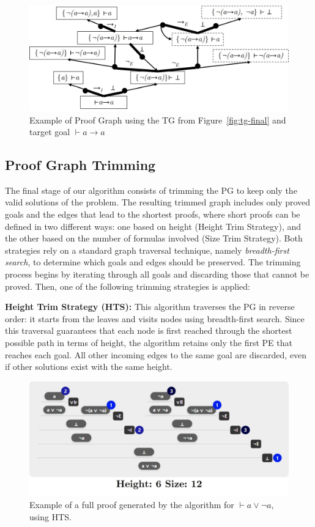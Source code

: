 \begin{figure}[h]
    \centering
    \includegraphics[width=0.8\linewidth]{resources/sg-gen.jpg}
    \caption{Example of Proof Graph using the TG from Figure~\ref{fig:tg-final} and target goal \(\vdash a \to a\)}
    \label{fig:st-ex}
\end{figure}

\subsection{Proof Graph Trimming}

The final stage of our algorithm consists of trimming the PG to keep only the valid solutions of the problem. The resulting trimmed graph includes only proved goals and the edges that lead to the shortest proofs, where short proofs can be defined in two different ways: one based on height (Height Trim Strategy), and the other based on the number of formulas involved (Size Trim Strategy). Both strategies rely on a standard graph traversal technique, namely \emph{breadth-first search}, to determine which goals and edges should be preserved. The trimming process begins by iterating through all goals and discarding those that cannot be proved. Then, one of the following trimming strategies is applied:
\vspace{1em}

\textbf{Height Trim Strategy (HTS):} This algorithm traverses the PG in reverse order: it starts from the leaves and visits nodes using breadth-first search. Since this traversal guarantees that each node is first reached through the shortest possible path in terms of height, the algorithm retains only the first PE that reaches each goal. All other incoming edges to the same goal are discarded, even if other solutions exist with the same height.

\begin{figure}[h]
    \centering
    \includegraphics[width=0.6\linewidth]{resources/trim-height.jpg}
    \caption{Example of a full proof generated by the algorithm for \(\vdash a \vee \lnot a\), using HTS.}
    \label{fig:sg-trim-height}
\end{figure}

